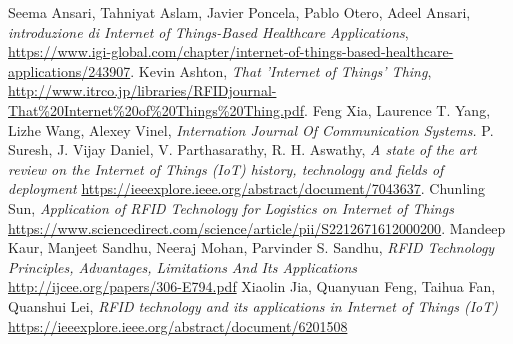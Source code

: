 \documentclass[a4paper,titlepage]{report}
\begin{document}
\begin{thebibliography}{99}
Seema Ansari, Tahniyat Aslam, Javier Poncela, Pablo Otero, Adeel Ansari,
\emph{introduzione di Internet of Things-Based Healthcare Applications},
\url{https://www.igi-global.com/chapter/internet-of-things-based-healthcare-applications/243907}.
Kevin Ashton,
\emph{That 'Internet of Things' Thing},
\url{http://www.itrco.jp/libraries/RFIDjournal-That%20Internet%20of%20Things%20Thing.pdf}.
Feng Xia, Laurence T. Yang, Lizhe Wang, Alexey Vinel,
\emph{Internation Journal Of Communication Systems.}
P. Suresh, J. Vijay Daniel, V. Parthasarathy, R. H. Aswathy,
\emph{A state of the art review on the Internet of Things (IoT) history, technology and fields of deployment}
\url{https://ieeexplore.ieee.org/abstract/document/7043637}.
Chunling Sun,
\emph{Application of RFID Technology for Logistics on Internet of Things}
\url{https://www.sciencedirect.com/science/article/pii/S2212671612000200}.
Mandeep Kaur, Manjeet Sandhu, Neeraj Mohan, Parvinder S. Sandhu,
\emph{RFID Technology Principles, Advantages, Limitations And Its Applications}
\url{http://ijcee.org/papers/306-E794.pdf}
Xiaolin Jia, Quanyuan Feng, Taihua Fan, Quanshui Lei,
\emph{RFID technology and its applications in Internet of Things (IoT)}
\url{https://ieeexplore.ieee.org/abstract/document/6201508}
\end{thebibliography}
\end{document}
